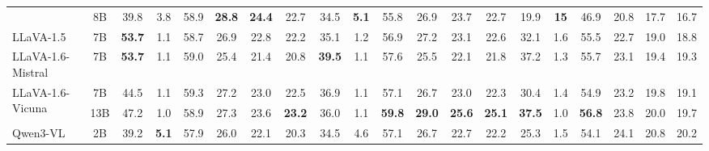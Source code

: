 \begin{table}[t]
{\begin{tabular}{lc|cccccc|cccccc|cccccc}
 & 8B & 39.8 & 3.8 & \cellcolor{gray!15}58.9 & \cellcolor{gray!15}\textbf{28.8} & \cellcolor{gray!15}\textbf{24.4} & \cellcolor{gray!15}22.7 & 34.5 & \textbf{5.1} & \cellcolor{gray!15}55.8 & \cellcolor{gray!15}26.9 & \cellcolor{gray!15}23.7 & \cellcolor{gray!15}22.7 & \cellcolor{gray!15}19.9 & \textbf{15} & 46.9 & \cellcolor{gray!15}20.8 & \cellcolor{gray!15}17.7 & \cellcolor{gray!15}16.7 \\
LLaVA-1.5 & 7B & \textbf{53.7} & 1.1 & \cellcolor{gray!15}58.7 & \cellcolor{gray!15}26.9 & \cellcolor{gray!15}22.8 & \cellcolor{gray!15}22.2 & 35.1 & 1.2 & \cellcolor{gray!15}56.9 & \cellcolor{gray!15}27.2 & \cellcolor{gray!15}23.1 & \cellcolor{gray!15}22.6 & 32.1 & 1.6 & \cellcolor{gray!15}55.5 & \cellcolor{gray!15}22.7 & \cellcolor{gray!15}19.0 & \cellcolor{gray!15}18.8 \\
LLaVA-1.6-Mistral & 7B & \textbf{53.7} & 1.1 & \cellcolor{gray!15}59.0 & \cellcolor{gray!15}25.4 & \cellcolor{gray!15}21.4 & \cellcolor{gray!15}20.8 & \textbf{39.5} & 1.1 & \cellcolor{gray!15}57.6 & \cellcolor{gray!15}25.5 & \cellcolor{gray!15}22.1 & \cellcolor{gray!15}21.8 & 37.2 & 1.3 & \cellcolor{gray!15}55.7 & \cellcolor{gray!15}23.1 & \cellcolor{gray!15}19.4 & \cellcolor{gray!15}19.3 \\
\multirow{2}{*}{LLaVA-1.6-Vicuna} & 7B & 44.5 & 1.1 & \cellcolor{gray!15}59.3 & \cellcolor{gray!15}27.2 & \cellcolor{gray!15}23.0 & \cellcolor{gray!15}22.5 & 36.9 & 1.1 & \cellcolor{gray!15}57.1 & \cellcolor{gray!15}26.7 & \cellcolor{gray!15}23.0 & \cellcolor{gray!15}22.3 & 30.4 & 1.4 & \cellcolor{gray!15}54.9 & \cellcolor{gray!15}23.2 & \cellcolor{gray!15}19.8 & \cellcolor{gray!15}19.1 \\
 & 13B & 47.2 & 1.0 & \cellcolor{gray!15}58.9 & \cellcolor{gray!15}27.3 & \cellcolor{gray!15}23.6 & \cellcolor{gray!15}\textbf{23.2} & 36.0 & 1.1 & \cellcolor{gray!15}\textbf{59.8} & \cellcolor{gray!15}\textbf{29.0} & \cellcolor{gray!15}\textbf{25.6} & \cellcolor{gray!15}\textbf{25.1} & \textbf{37.5} & 1.0 & \cellcolor{gray!15}\textbf{56.8} & \cellcolor{gray!15}23.8 & \cellcolor{gray!15}20.0 & \cellcolor{gray!15}19.7 \\
\multirow{4}{*}{Qwen3-VL} & 2B & 39.2 & \textbf{5.1} & \cellcolor{gray!15}57.9 & \cellcolor{gray!15}26.0 & \cellcolor{gray!15}22.1 & \cellcolor{gray!15}20.3 & 34.5 & 4.6 & \cellcolor{gray!15}57.1 & \cellcolor{gray!15}26.7 & \cellcolor{gray!15}22.7 & \cellcolor{gray!15}22.2 & \cellcolor{gray!15}25.3 & 1.5 & \cellcolor{gray!15}54.1 & \cellcolor{gray!15}24.1 & \cellcolor{gray!15}20.8 & \cellcolor{gray!15}20.2 \\

\end{tabular}}
\end{table}
